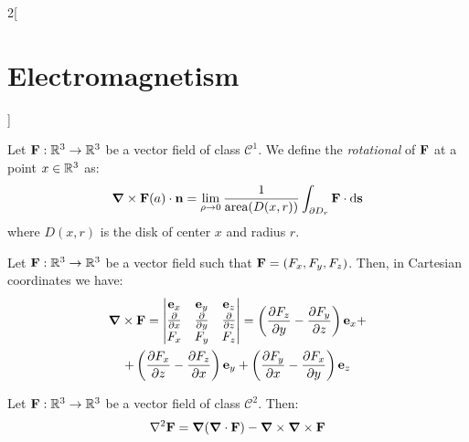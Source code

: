 \documentclass[../../../main.tex]{subfiles}
\begin{document}
\begin{multicols}{2}[\section{Electromagnetism}]
  \begin{definition}[Rotational]
    Let $\boldsymbol{\mathrm{F}}:\mathbb{R}^3\rightarrow\mathbb{R}^3$ be a vector field of class $\mathcal{C}^1$. We define the \emph{rotational} of $\boldsymbol{\mathrm{F}}$ at a point $x\in\mathbb{R}^3$ as:
    $$\boldsymbol{\mathrm{\nabla}}\times\boldsymbol{\mathrm{F}}(a)\cdot\boldsymbol{\mathrm{n}}=\lim_{\rho\to 0}\frac{1}{\text{area}(D(x,r))}\int_{\partial D_r}\boldsymbol{\mathrm{F}}\cdot \dd \boldsymbol{\mathrm{s}}$$
    where $D(x,r)$ is the disk of center $x$ and radius $r$.
  \end{definition}
  \begin{prop}
    Let $\boldsymbol{\mathrm{F}}:\mathbb{R}^3\rightarrow\mathbb{R}^3$ be a vector field such that $\boldsymbol{\mathrm{F}}=(F_x,F_y,F_z)$. Then, in Cartesian coordinates we have:
    \begin{multline*}
      \boldsymbol{\mathrm{\nabla}}\times \boldsymbol{\mathrm{F}}=
      \begin{vmatrix}
        \boldsymbol{\mathrm{e}}_x  & \boldsymbol{\mathrm{e}}_y  & \boldsymbol{\mathrm{e}}_z  \\
        \pdv{}{x} & \pdv{}{y} & \pdv{}{z} \\
        F_x       & F_y       & F_z       \\
      \end{vmatrix} = \left(\frac{\partial F_z}{\partial y}-\frac{\partial F_y}{\partial z}\right)\boldsymbol{\mathrm{e}}_x+\\+\left(\frac{\partial F_x}{\partial z}-\frac{\partial F_z}{\partial x}\right)\boldsymbol{\mathrm{e}}_y+\left(\frac{\partial F_y}{\partial x}-\frac{\partial F_x}{\partial y}\right)\boldsymbol{\mathrm{e}}_z
    \end{multline*}
  \end{prop}
  \begin{prop}
    Let $\boldsymbol{\mathrm{F}}:\mathbb{R}^3\rightarrow\mathbb{R}^3$ be a vector field of class $\mathcal{C}^2$. Then: $$\laplacian\vf{F}=\grad(\divp\vf{F})-\rotp\rotp\vf{F}$$
  \end{prop}

\end{multicols}
\end{document}

